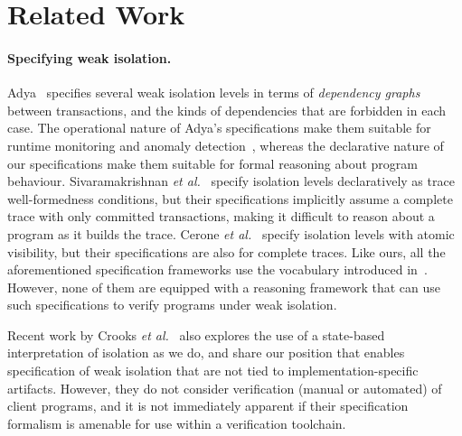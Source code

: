 \vspace*{-6pt}
\section{Related Work}
\label{sec:relatedwork}

\paragraph{Specifying weak isolation.}
Adya~\cite{adyaphd} specifies several weak isolation levels in terms
of \emph{dependency graphs} between transactions, and the kinds of
dependencies that are forbidden in each case. The operational nature
of Adya's specifications make them suitable for runtime monitoring and
anomaly detection~\cite{kemmevldb,feketesigmod08,pssi2011}, whereas
the declarative nature of our specifications make them suitable for
formal reasoning about program behaviour. Sivaramakrishnan \emph{et
al.}~\cite{pldi15} specify isolation levels declaratively as trace
well-formedness conditions, but their specifications implicitly assume
a complete trace with only committed transactions, making it difficult
to reason about a program as it builds the trace. Cerone \emph{et
al.}~\cite{gotsmanconcur15} specify isolation levels with atomic
visibility, but their specifications are also for complete traces.
Like ours, all the aforementioned specification frameworks use the
vocabulary introduced in~\cite{burckhardt14}. However, none of them
are equipped with a reasoning framework that can use such
specifications to verify programs under weak isolation.

Recent work by Crooks \emph{et al.}~\cite{CPA+17} also explores the
use of a state-based interpretation of isolation as we do, and share
our position that enables specification of weak isolation that are not
tied to implementation-specific artifacts.  However, they do not
consider verification (manual or automated) of client programs, and it
is not immediately apparent if their specification formalism is
amenable for use within a verification toolchain. 

\vspace*{-4pt}
